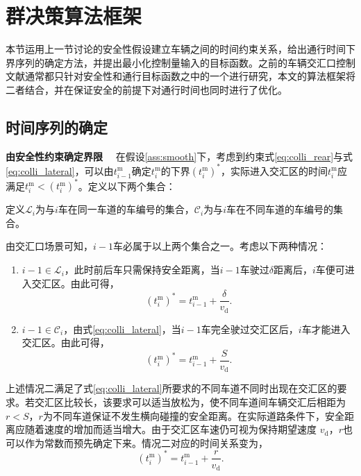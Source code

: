 \section{群决策算法框架}
本节运用上一节讨论的安全性假设建立车辆之间的时间约束关系，给出通行时间下界序列的确定方法，并提出最小化控制量输入的目标函数。之前的车辆交汇口控制文献通常都只针对安全性和通行目标函数之中的一个进行研究，本文的算法框架将二者结合，并在保证安全的前提下对通行时间也同时进行了优化。
\subsection{时间序列的确定}
\label{ssec:time_series}
\textbf{由安全性约束确定界限}
\ \ 在假设\ref{ass:smooth}下，考虑到约束式\eqref{eq:colli_rear}与式\eqref{eq:colli_lateral}，可以由$t_{i-1}^\mathrm{m}$确定$t_i^\mathrm{m}$的下界$(t_i^\mathrm{m})^*$，实际进入交汇区的时间$t_i^\mathrm{m}$应满足$t_i^\mathrm{m} < (t_i^\mathrm{m})^*$。定义以下两个集合：
\begin{definition}
定义$\mathcal{L}_i$为与$i$车在同一车道的车编号的集合，$\mathcal{C}_i$为与$i$车在不同车道的车编号的集合。
\end{definition}
由交汇口场景可知，$i-1$车必属于以上两个集合之一。考虑以下两种情况：
\begin{enumerate}[label=(\arabic*), wide=\parindent]
\item $i-1\in \mathcal{L}_i$，此时前后车只需保持安全距离，当$i-1$车驶过$\delta$距离后，$i$车便可进入交汇区。由此可得，
\begin{equation}
(t_i^\mathrm{m})^*=t_{i-1}^\mathrm{m} + \frac{\delta}{v_\mathrm{d}}.
\label{eq:t_case1}
\end{equation}
\item $i-1\in \mathcal{C}_i$，由式\eqref{eq:colli_lateral}，当$i-1$车完全驶过交汇区后，$i$车才能进入交汇区。由此可得，
\begin{equation}
(t_i^\mathrm{m})^*=t_{i-1}^\mathrm{m} + \frac{S}{v_\mathrm{d}}.
\label{eq:t_case2}
\end{equation}
\end{enumerate}

上述情况二满足了式\eqref{eq:colli_lateral}所要求的不同车道不同时出现在交汇区的要求。若交汇区比较长，该要求可以适当放松为，使不同车道间车辆交汇后相距为 $r < S$，$r$为不同车道保证不发生横向碰撞的安全距离。在实际道路条件下，安全距离应随着速度的增加而适当增大。由于交汇区车速仍可视为保持期望速度 $v_\mathrm{d}$，$r$也可以作为常数而预先确定下来。情况二对应的时间关系变为，
\begin{equation}
(t_i^\mathrm{m})^*=t_{i-1}^\mathrm{m} + \frac{r}{v_\mathrm{d}}.
\label{eq:t_case2r}
\end{equation}

